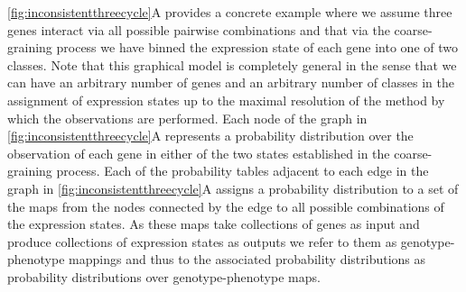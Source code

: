 \ref{fig:inconsistentthreecycle}A provides a concrete example where we assume three genes interact via all possible pairwise combinations and that via the coarse-graining process we have binned the expression state of each gene into one of two classes. Note that this graphical model is completely general in the sense that we can have an arbitrary number of genes and an arbitrary number of classes in the assignment of expression states up to the maximal resolution of the method by which the observations are performed. Each node of the graph in \ref{fig:inconsistentthreecycle}A represents a probability distribution over the observation of each gene in either of the two states established in the coarse-graining process. %
Each of the probability tables adjacent to each edge in the graph in \ref{fig:inconsistentthreecycle}A assigns a probability distribution to a set of the maps from the nodes connected by the edge to all possible combinations of the expression states. As these maps take collections of genes as input and produce collections of expression states as outputs we refer to them as genotype-phenotype mappings and thus to the associated probability distributions as probability distributions over genotype-phenotype maps.

